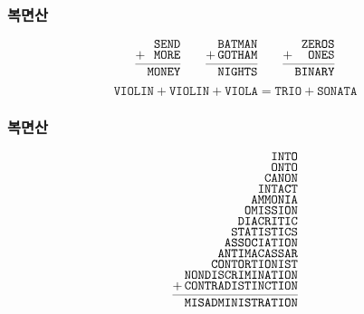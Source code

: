 \documentclass{beamer}
\begin{document}
%
\begin{frame}
  \frametitle{복면산}
             {\LARGE
               \[
               \def\arraystretch{0.7}
               \begin{array}{c@{\,}r}
                 & \texttt{SEND} \\
                 + & \texttt{MORE} \\
                 \cmidrule(lr){1-2}
                 & \texttt{MONEY}
               \end{array}
               \quad
               \def\arraystretch{0.7}
               \begin{array}{c@{\,}r}
                 & \texttt{BATMAN} \\
                 + & \texttt{GOTHAM} \\
                 \cmidrule(lr){1-2}
                 & \texttt{NIGHTS}
               \end{array}
               \quad
               \begin{array}{c@{\,}r}
                 & \texttt{ZEROS} \\
                 + & \texttt{ONES} \\
                 \cmidrule(lr){1-2}
                 & \texttt{BINARY}
               \end{array}
               \]
             }
             \vspace{5mm}
                    {\Large
                      \[ \texttt{VIOLIN}+\texttt{VIOLIN}+\texttt{VIOLA}=\texttt{TRIO}+\texttt{SONATA} \]
                    }
\end{frame}

%
\begin{frame}
  \frametitle{복면산}
  \[
  \def\arraystretch{0.7}
  \begin{array}{c@{\,}r}
    & \texttt{INTO} \\
    & \texttt{ONTO} \\
    & \texttt{CANON} \\
    & \texttt{INTACT} \\
    & \texttt{AMMONIA} \\
    & \texttt{OMISSION} \\
    & \texttt{DIACRITIC} \\
    & \texttt{STATISTICS} \\
    & \texttt{ASSOCIATION} \\
    & \texttt{ANTIMACASSAR} \\
    & \texttt{CONTORTIONIST} \\
    & \texttt{NONDISCRIMINATION} \\
    + & \texttt{CONTRADISTINCTION} \\
    \cmidrule(lr){1-2}
    & \texttt{MISADMINISTRATION}
  \end{array}
  \]
\end{frame}
\end{document}
